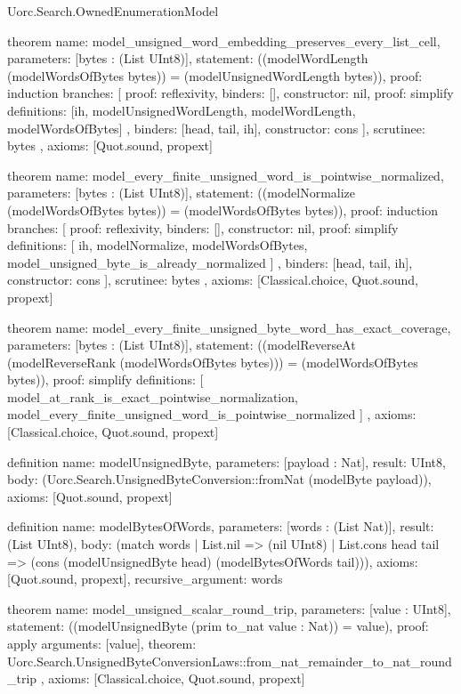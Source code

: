 \begin{lexlean}{Uorc.Search.OwnedEnumerationModel}
\begin{semanticmodule}
theorem{
  name: model_unsigned_word_embedding_preserves_every_list_cell,
  parameters: [bytes : (List UInt8)],
  statement: ((modelWordLength (modelWordsOfBytes bytes)) = (modelUnsignedWordLength bytes)),
  proof: induction{
    branches: [
      {proof: reflexivity{}, binders: [], constructor: nil},
      {
        proof: simplify{
          definitions: [ih, modelUnsignedWordLength, modelWordLength, modelWordsOfBytes]
        },
        binders: [head, tail, ih],
        constructor: cons
      }
    ],
    scrutinee: bytes
  },
  axioms: [Quot.sound, propext]
}

theorem{
  name: model_every_finite_unsigned_word_is_pointwise_normalized,
  parameters: [bytes : (List UInt8)],
  statement: ((modelNormalize (modelWordsOfBytes bytes)) = (modelWordsOfBytes bytes)),
  proof: induction{
    branches: [
      {proof: reflexivity{}, binders: [], constructor: nil},
      {
        proof: simplify{
          definitions: [
            ih,
            modelNormalize,
            modelWordsOfBytes,
            model_unsigned_byte_is_already_normalized
          ]
        },
        binders: [head, tail, ih],
        constructor: cons
      }
    ],
    scrutinee: bytes
  },
  axioms: [Classical.choice, Quot.sound, propext]
}

theorem{
  name: model_every_finite_unsigned_byte_word_has_exact_coverage,
  parameters: [bytes : (List UInt8)],
  statement: ((modelReverseAt (modelReverseRank (modelWordsOfBytes bytes))) = (modelWordsOfBytes bytes)),
  proof: simplify{
    definitions: [
      model_at_rank_is_exact_pointwise_normalization,
      model_every_finite_unsigned_word_is_pointwise_normalized
    ]
  },
  axioms: [Classical.choice, Quot.sound, propext]
}

definition{
  name: modelUnsignedByte,
  parameters: [payload : Nat],
  result: UInt8,
  body: (Uorc.Search.UnsignedByteConversion::fromNat (modelByte payload)),
  axioms: [Quot.sound, propext]
}

definition{
  name: modelBytesOfWords,
  parameters: [words : (List Nat)],
  result: (List UInt8),
  body: (match words
    | List.nil => (nil UInt8)
    | List.cons head tail => (cons (modelUnsignedByte head) (modelBytesOfWords tail))),
  axioms: [Quot.sound, propext],
  recursive_argument: words
}

theorem{
  name: model_unsigned_scalar_round_trip,
  parameters: [value : UInt8],
  statement: ((modelUnsignedByte (prim to_nat value : Nat)) = value),
  proof: apply{
    arguments: [value],
    theorem: Uorc.Search.UnsignedByteConversionLaws::from_nat_remainder_to_nat_round_trip
  },
  axioms: [Classical.choice, Quot.sound, propext]
}


\end{semanticmodule}
\end{lexlean}
